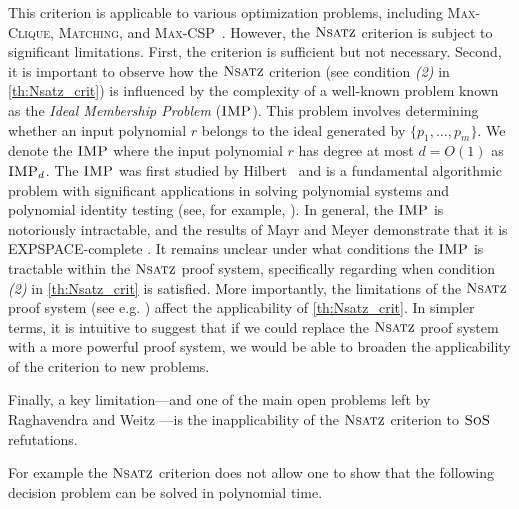 \documentclass[11pt]{article}
\newcommand{\sos}{\text{\sc{SoS}}}
\newcommand{\IMP}{\textsc{IMP}}
\newcommand{\Nsatz}{\textsc{Nsatz}}
\newcommand{\1}{\textbf{1}}
\begin{document}
This criterion is applicable to various optimization problems, including \textsc{Max-Clique}, \textsc{Matching}, and \textsc{Max-CSP}~\cite{raghavendra_weitz2017}. 
%
However, the \(\Nsatz\) criterion is subject to significant limitations. First, the criterion is sufficient but not necessary.
Second, it is important to observe how the $\Nsatz$ criterion (see condition \textit{(2)} in \cref{th:Nsatz_crit}) is influenced by the complexity of a well-known problem known as the \emph{Ideal Membership Problem} (\(\IMP\)). This problem involves determining whether an input polynomial \(r\) belongs to the ideal generated by \(\{p_1, \ldots, p_m\}\). We denote the \(\IMP\) where the input polynomial \(r\) has degree at most \(d=O(1)\) as \(\IMP_d\). The \(\IMP\) was first studied by Hilbert~\cite{Hilbert1893} and is a fundamental algorithmic problem with significant applications in solving polynomial systems and polynomial identity testing (see, for example, \cite{Cox}). In general, the \(\IMP\) is notoriously intractable, and the results of Mayr and Meyer demonstrate that it is EXPSPACE-complete \cite{Mayr1989, MAYR1982305}.
It remains unclear under what conditions the \(\IMP\) is tractable within the \(\Nsatz\) proof system, specifically regarding when condition \textit{(2)} in \cref{th:Nsatz_crit} is satisfied. More importantly, the limitations of the \(\Nsatz\) proof system (see e.g. \cite{FlemingKothariPitassi19}) affect the applicability of \cref{th:Nsatz_crit}. 
In simpler terms, it is intuitive to suggest that if we could replace the \(\Nsatz\) proof system with a more powerful proof system, we would be able to broaden the applicability of the criterion to new problems.
%

Finally, a key limitation—and one of the main open problems left by Raghavendra and Weitz \cite{raghavendra_weitz2017, Weitz:Phd}—is the inapplicability of the $\Nsatz$ criterion to \(\sos\) refutations.
%

For example the $\Nsatz$ criterion does not allow one to show that the following decision problem can be solved in polynomial time. 
\end{document}
